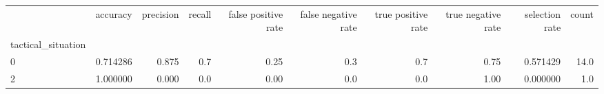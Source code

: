 \begin{tabular}{lrrrrrrrrr}
\toprule
{} &  accuracy &  precision &  recall &  false positive rate &  false negative rate &  true positive rate &  true negative rate &  selection rate &  count \\
tactical\_situation &           &            &         &                      &                      &                     &                     &                 &        \\
\midrule
0                  &  0.714286 &      0.875 &     0.7 &                 0.25 &                  0.3 &                 0.7 &                0.75 &        0.571429 &   14.0 \\
2                  &  1.000000 &      0.000 &     0.0 &                 0.00 &                  0.0 &                 0.0 &                1.00 &        0.000000 &    1.0 \\
\bottomrule
\end{tabular}
